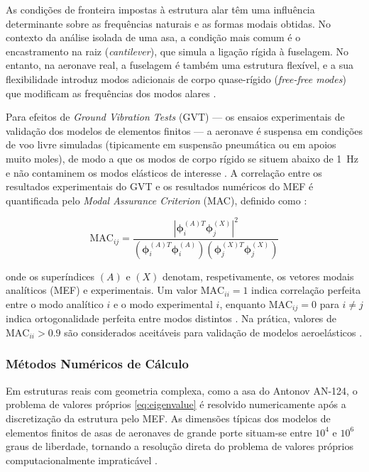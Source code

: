 \documentclass[a4paper,fleqn,noprintline]{cas-dc}
\begin{document}
As condições de fronteira impostas à estrutura alar têm uma influência determinante sobre as frequências naturais e as formas modais obtidas. No contexto da análise isolada de uma asa, a condição mais comum é o encastramento na raiz (\textit{cantilever}), que simula a ligação rígida à fuselagem. No entanto, na aeronave real, a fuselagem é também uma estrutura flexível, e a sua flexibilidade introduz modos adicionais de corpo quase-rígido (\textit{free-free modes}) que modificam as frequências dos modos alares \cite{Wright2015}.

Para efeitos de \textit{Ground Vibration Tests} (GVT) --- os ensaios experimentais de validação dos modelos de elementos finitos --- a aeronave é suspensa em condições de voo livre simuladas (tipicamente em suspensão pneumática ou em apoios muito moles), de modo a que os modos de corpo rígido se situem abaixo de \SI{1}{\hertz} e não contaminem os modos elásticos de interesse \cite{Ewins2000}. A correlação entre os resultados experimentais do GVT e os resultados numéricos do MEF é quantificada pelo \textit{Modal Assurance Criterion} (MAC), definido como \cite{Allemang1982}:

\begin{equation}
    \text{MAC}_{ij} = \frac{\left| \boldsymbol{\phi}_i^{(A)T} 
    \boldsymbol{\phi}_j^{(X)} \right|^2}
    {\left( \boldsymbol{\phi}_i^{(A)T} \boldsymbol{\phi}_i^{(A)} 
    \right)
    \left( \boldsymbol{\phi}_j^{(X)T} \boldsymbol{\phi}_j^{(X)} 
    \right)}
    \label{eq:mac}
\end{equation}

\noindent onde os superíndices $(A)$ e $(X)$ denotam, respetivamente, os vetores modais analíticos (MEF) e experimentais. Um valor $\text{MAC}_{ii} = 1$ indica correlação perfeita entre o modo analítico $i$ e o modo experimental $i$, enquanto $\text{MAC}_{ij} = 0$ para $i \neq j$ indica ortogonalidade perfeita entre modos distintos \cite{Allemang1982, Ewins2000}. Na prática, valores de $\text{MAC}_{ii} > 0.9$ são considerados aceitáveis para validação de modelos aeroelásticos \cite{EASA2022}.

\subsubsection{Métodos Numéricos de Cálculo}

Em estruturas reais com geometria complexa, como a asa do Antonov AN-124, o problema de valores próprios \eqref{eq:eigenvalue} é resolvido numericamente após a discretização da estrutura pelo MEF. As dimensões típicas dos modelos de elementos finitos de asas de aeronaves de grande porte situam-se entre $10^4$ e $10^6$ graus de liberdade, tornando a resolução direta do problema de valores próprios computacionalmente impraticável \cite{Nastran2014}.
\end{document}
